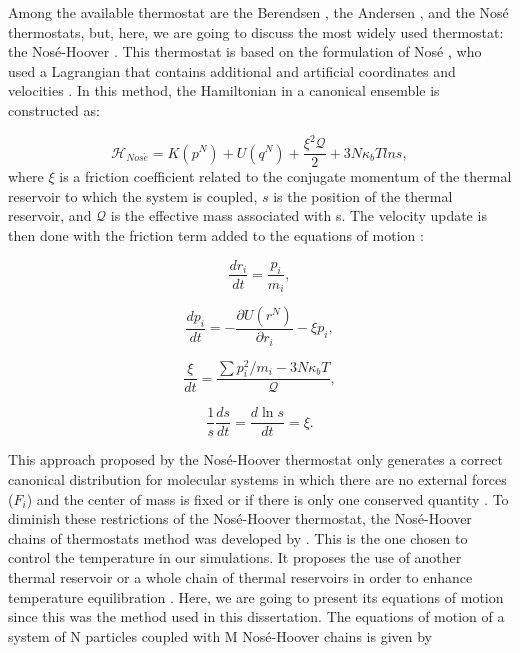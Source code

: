 Among the available thermostat are the Berendsen \cite{doi:10.1063/1.448118}, the Andersen \cite{1980JChPh722384A}, and the Nos\'{e} \cite{1984JChPh81511N} thermostats, but, here, we are going to discuss the most widely used thermostat: the Nosé-Hoover \cite{PhysRevA.31.1695}. This thermostat is based on the formulation of Nosé \cite{1984JChPh81511N}, who used a Lagrangian that contains additional and artificial coordinates and velocities \cite{frenkel}. In this method, the Hamiltonian in a canonical ensemble is constructed as:

\begin{equation}
\mathcal{H}_{Nos\acute{e}} =  K(p^{N}) + U(q^{N})  + \frac{\xi ^{2} \mathcal{Q}}{2} + 3N\kappa_{b}T ln s ,
\end{equation}
where $\xi$ is a friction coefficient related to the conjugate momentum of the thermal reservoir to which the system is coupled, $s$ is the position of the thermal reservoir, and $\mathcal{Q}$ is the effective mass associated with s. The velocity update is then done with the friction term added to the equations of motion \cite{shell2015}:

\begin{equation}
\frac{dr_{i}}{dt} = \frac{p_i}{m_i},
\end{equation}

\begin{equation}
\frac{dp_{i}}{dt} = -  \frac{\partial U (r^{N})}{\partial r_{i}} - \xi p_{i},
\end{equation}

\begin{equation}
\frac{\xi}{dt} = \frac{\sum p_{i}^{2}/m_{i} - 3N\kappa_{b}T}{\mathcal{Q}} ,
\end{equation}

\begin{equation}
\frac{1}{s}\frac{ds}{dt} =\frac{d \ln s}{dt} = \xi.
\end{equation}

This approach proposed by the Nos\'{e}-Hoover thermostat only generates a correct canonical distribution for molecular systems in which there are no external forces ($F_{i}$) and the center of mass is fixed or if there is only one conserved quantity \cite{frenkel}. To diminish these restrictions of the Nosé-Hoover thermostat, the Nosé-Hoover chains of thermostats method was developed by . This is the one chosen to control the temperature in our simulations. It proposes the use of another thermal reservoir or a whole chain of thermal reservoirs in order to enhance temperature equilibration \cite{shell2015}. Here, we are going to present its equations of motion since this was the method used in this dissertation. The equations of motion of a system of N particles coupled with M Nos\'{e}-Hoover chains is given by

